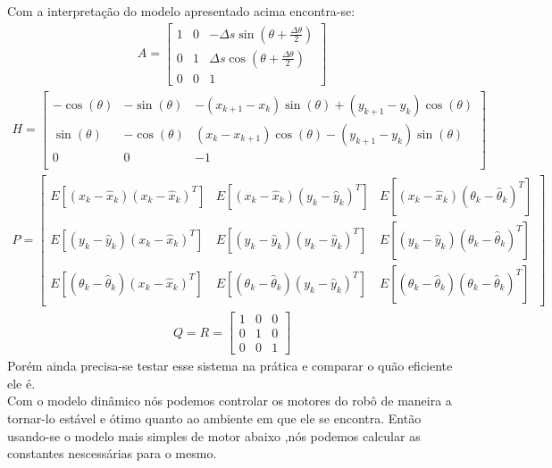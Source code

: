 \documentclass[11pt,a4paper]{article}
\begin{document}
Com a interpretação do modelo apresentado acima encontra-se:\\
\begin{align}
A=\left[\begin{array}{ccc}
 1&0 &-\Delta s \sin(\theta + \frac{\Delta \theta}{2}) \\
 0&1 &\Delta s \cos(\theta + \frac{\Delta \theta}{2}) \\
 0&0&1
\end{array}\right] \tag{2.6}
\end{align}
\begin{align}
H=\left[\begin{array}{ccc}
-\cos(\theta)&-\sin(\theta) &-(x_{k+1}-x_k)\sin(\theta) + (y_{k+1}-y_k)\cos(\theta)\\
\sin(\theta)&-\cos(\theta) &(x_k-x_{k+1})\cos(\theta)-(y_{k+1}-y_k)\sin(\theta)\\
0&0 &-1\\
\end{array}\right] \tag{2.7}
\end{align}
\begin{align}
P=\left[\begin{array}{ccc}   
  E[(x_k-\hat{x}_k)(x_k-\hat{x}_k)^{T}]  &    E[(x_k-\hat{x}_k)(y_k-\hat{y}_k)^{T}]
  & E[(x_k-\hat{x}_k)(\theta_k-\hat{\theta}_k)^{T}]     \\
  E[(y_k-\hat{y}_k)(x_k-\hat{x}_k)^{T}]&
   E[(y_k-\hat{y}_k)(y_k-\hat{y}_k)^{T}]
    & E[(y_k-\hat{y}_k)(\theta_k-\hat{\theta}_k)^{T}]    \\
 E[(\theta_k-\hat{\theta}_k)(x_k-\hat{x}_k)^{T}] & E[(\theta_k-\hat{\theta}_k)(y_k-\hat{y}_k)^{T}] 
 & E[(\theta_k-\hat{\theta}_k)(\theta_k-\hat{\theta}_k)^{T}]    
           \end{array}\right] \tag{2.8}
\end{align}
\begin{align}
Q=R=\left[ \begin{array}{ccc}
1&0&0\\
0&1&0\\
0&0&1
\end{array}                   \right] \tag{2.9}
\end{align}
\hspace{1.5cm}Porém ainda precisa-se testar esse sistema na prática e comparar o quão eficiente ele é.\\
Com o modelo dinâmico nós podemos controlar os motores do robô de maneira a tornar-lo estável e ótimo quanto ao ambiente em que ele se encontra. Então usando-se o modelo mais simples de motor abaixo ,nós podemos calcular as constantes nescessárias para o mesmo.
\end{document}
